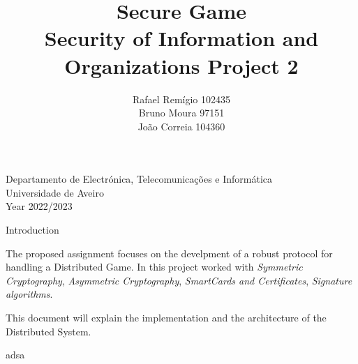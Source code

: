 \documentclass[11pt]{article}
\begin{document}
\begin{titlepage}

\title{%
  Secure Game \\
  \large  Security of Information and Organizations Project 2\\}

\author{Rafael Remígio 102435 \\ Bruno Moura 97151\\ João Correia 104360}

\maketitle

\vfill
\begin{center}

	Departamento de Electrónica, Telecomunicações e Informática\\
       Universidade de Aveiro\\ Year 2022/2023
\end{center}



\end{titlepage}


\begin{center}
	\Huge Introduction
\end{center}


\par The proposed assignment focuses on the develpment of a robust protocol for handling a Distributed Game. In this project worked with \emph{Symmetric Cryptography}, \emph{Asymmetric Cryptography}, \emph{SmartCards and Certificates}, \emph{Signature algorithms}.
\par This document will explain the implementation and the architecture of the Distributed System.

\pagebreak

adsa
\end{document}
